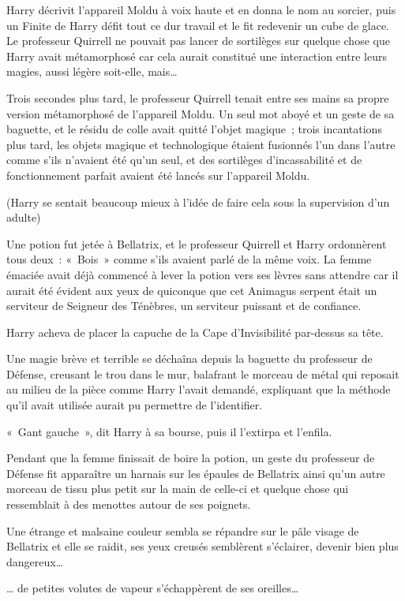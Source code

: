 Harry décrivit l'appareil Moldu à voix haute et en donna le nom au sorcier, puis un Finite de Harry défit tout ce dur travail et le fit redevenir un cube de glace.
Le professeur Quirrell ne pouvait pas lancer de sortilèges sur quelque chose que Harry avait métamorphosé car cela aurait constitué une interaction entre leurs magies, aussi légère soit-elle, mais…

Trois secondes plus tard, le professeur Quirrell tenait entre ses mains sa propre version métamorphosé de l'appareil Moldu.
Un seul mot aboyé et un geste de sa baguette, et le résidu de colle avait quitté l'objet magique~; trois incantations plus tard, les objets magique et technologique étaient fusionnés l'un dans l'autre comme s'ils n'avaient été qu'un seul, et des sortilèges d'incassabilité et de fonctionnement parfait avaient été lancés sur l'appareil Moldu.

(Harry se sentait beaucoup mieux à l'idée de faire cela sous la supervision d'un adulte)

Une potion fut jetée à Bellatrix, et le professeur Quirrell et Harry ordonnèrent tous deux~: «~Bois~» comme s'ils avaient parlé de la même voix.
La femme émaciée avait déjà commencé à lever la potion vers ses lèvres sans attendre car il aurait été évident aux yeux de quiconque que cet Animagus serpent était un serviteur de Seigneur des Ténèbres, un serviteur puissant et de confiance.

Harry acheva de placer la capuche de la Cape d'Invisibilité par-dessus sa tête.

Une magie brève et terrible se déchaîna depuis la baguette du professeur de Défense, creusant le trou dans le mur, balafrant le morceau de métal qui reposait au milieu de la pièce comme Harry l'avait demandé, expliquant que la méthode qu'il avait utilisée aurait pu permettre de l'identifier.

«~Gant gauche~», dit Harry à sa bourse, puis il l'extirpa et l'enfila.

Pendant que la femme finissait de boire la potion, un geste du professeur de Défense fit apparaître un harnais sur les épaules de Bellatrix ainsi qu'un autre morceau de tissu plus petit sur la main de celle-ci et quelque chose qui ressemblait à des menottes autour de ses poignets.

Une étrange et malsaine couleur sembla se répandre sur le pâle visage de Bellatrix et elle se raidit, ses yeux creusés semblèrent s'éclairer, devenir bien plus dangereux…

… de petites volutes de vapeur s'échappèrent de ses oreilles…

